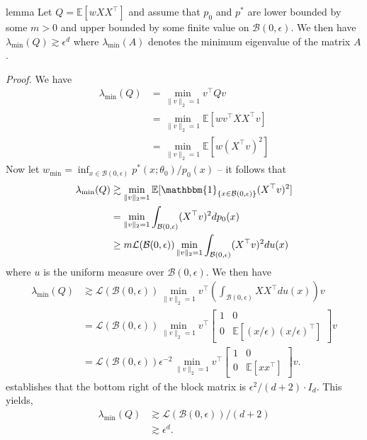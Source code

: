 \documentclass[11pt]{article}
\begin{document}
\begin{restatable}{lemma}{}
    Let $Q = \mathbb{E}\left[wXX^{\top}\right]$
    and assume that $p_0$ and $p^*$ are lower bounded by some $m > 0$ and upper bounded by some finite value on $\mathcal{B}(0, \epsilon)$. We then have
    $\lambda_{\min}(Q) \gtrsim \epsilon^d$ where $\lambda_{\min}(A)$ denotes the minimum eigenvalue of the matrix $A$. 
    \label{lemma: Q op norm}
\end{restatable}
\noindent \textit{Proof.} We have
\begin{align*}
    \lambda_{\min}(Q) &= \min_{\|v\|_2 = 1}v^{\top}Qv \\
    &= \min_{\|v\|_2 = 1} \mathbb{E}[wv^{\top}XX^{\top}v] \\
    &= \min_{\|v\|_2 = 1} \mathbb{E}[w(X^{\top}v)^2]
\end{align*}
Now let $w_{\min} = \inf_{x \in \mathcal{B}(0, \epsilon)}p^*(x; \theta_0)/p_0(x)$ -- it follows that
\begin{align*}
    \lambda_{\min}(Q) &\gtrsim \min_{\|v\|_2 = 1}\mathbb{E}[\mathbbm{1}_{\{x \in \mathcal{B}(0, \epsilon)\}}(X^{\top}v)^2] \\
    &= \min_{\|v\|_2 = 1}\int_{\mathcal{B}(0, \epsilon)}(X^{\top}v)^2 dp_0(x) \\
    &\geq m \mathcal{L}(\mathcal{B}(0, \epsilon))\min_{\|v\|_2 = 1}\int_{\mathcal{B}(0, \epsilon)}(X^{\top}v)^2 du(x)
\end{align*}
where $u$ is the uniform measure over $\mathcal{B}(0, \epsilon)$. We then have
\begin{align*}
    \lambda_{\min}(Q) &\gtrsim \mathcal{L}(\mathcal{B}(0, \epsilon))\min_{\|v\|_2 = 1} v^{\top}\left(\int_{\mathcal{B}(0, \epsilon)}XX^{\top} du(x)\right)v \\
    &= \mathcal{L}(\mathcal{B}(0, \epsilon))\min_{\|v\|_2 = 1} v^{\top}\begin{bmatrix}
        1 & 0 \\
        0 & \mathbb{E}[(x/\epsilon)(x/\epsilon)^{\top}]
    \end{bmatrix}v \\
    &= \mathcal{L}(\mathcal{B}(0, \epsilon))\epsilon^{-2}\min_{\|v\|_2 = 1} v^{\top}\begin{bmatrix}
        1 & 0 \\
        0 & \mathbb{E}[xx^{\top}]
    \end{bmatrix}v.
\end{align*}
 establishes that the bottom right of the block matrix is $\epsilon^2/(d+2) \cdot I_d$. This yields,
\begin{align*}
    \lambda_{\min}(Q) &\gtrsim \mathcal{L}(\mathcal{B}(0, \epsilon))/(d+2) \\
    &\gtrsim \epsilon^d. 
\end{align*}
\end{document}
